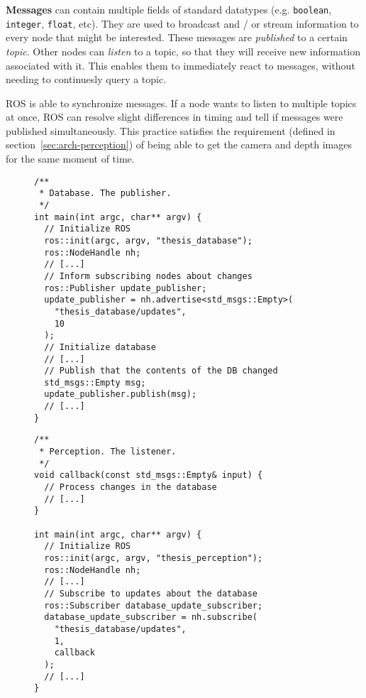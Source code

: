 \textbf{Messages} can contain multiple fields of standard datatypes (e.g. \texttt{boolean}, \texttt{integer}, \texttt{float}, etc). They are used to broadcast and / or stream information to every node that might be interested. These messages are \textit{published} to a certain \textit{topic}. Other nodes can \textit{listen} to a topic, so that they will receive new information associated with it. This enables them to immediately react to messages, without needing to continuesly query a topic.

ROS is able to synchronize messages. If a node wants to listen to multiple topics at once, ROS can resolve slight differences in timing and tell if messages were published simultaneously. This practice satisfies the requirement (defined in section~\ref{sec:arch-perception}) of being able to get the camera and depth images for the same moment of time.

\begin{figure}[H]
  \begin{lstlisting}[caption=An example for the use of ROS messages in this work. The database informs others about changes.]
/**
 * Database. The publisher.
 */
int main(int argc, char** argv) {
  // Initialize ROS
  ros::init(argc, argv, "thesis_database");
  ros::NodeHandle nh;
  // [...]
  // Inform subscribing nodes about changes
  ros::Publisher update_publisher;
  update_publisher = nh.advertise<std_msgs::Empty>(
    "thesis_database/updates",
    10
  );
  // Initialize database
  // [...]
  // Publish that the contents of the DB changed
  std_msgs::Empty msg;
  update_publisher.publish(msg);
  // [...]
}
  \end{lstlisting}
\end{figure}

\begin{figure}[H]
  \begin{lstlisting}[caption=An example for the use of ROS messages in this work. The perception reacts to changes to the database.]
/**
 * Perception. The listener.
 */
void callback(const std_msgs::Empty& input) {
  // Process changes in the database
  // [...]
}

int main(int argc, char** argv) {
  // Initialize ROS
  ros::init(argc, argv, "thesis_perception");
  ros::NodeHandle nh;
  // [...]
  // Subscribe to updates about the database
  ros::Subscriber database_update_subscriber;
  database_update_subscriber = nh.subscribe(
    "thesis_database/updates",
    1,
    callback
  );
  // [...]
}
  \end{lstlisting}
\end{figure}

